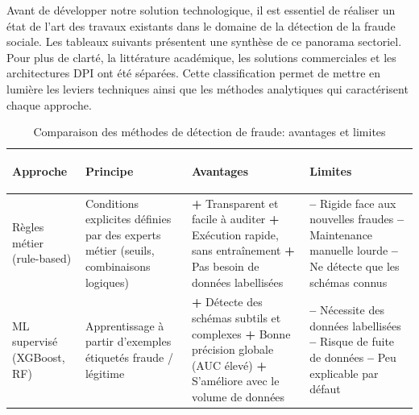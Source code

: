 \documentclass[a4paper, oneside, 12pt]{book}
\newcommand{\thead}[1]{\cellcolor{EYdark}\textcolor{white}{\textbf{#1}}}
\renewcommand{\thead}[1]{\cellcolor{EYyellow}\textcolor{EYdark}{\textbf{#1}}}
\begin{document}
\hspace{0.5cm}Avant de développer notre solution technologique, il est essentiel de réaliser un état de l'art des travaux existants dans le domaine de la détection de la fraude sociale. Les tableaux suivants présentent une synthèse de ce panorama sectoriel. Pour plus de clarté, la littérature académique, les solutions commerciales et les architectures DPI  ont été séparées. Cette classification permet de mettre en lumière les leviers techniques ainsi que les méthodes analytiques qui caractérisent chaque approche.
\begin{table}[H]
\centering
\caption{Comparaison des méthodes de détection de fraude: avantages et limites}
\label{tab:comparaison_approches}
\renewcommand{\arraystretch}{1.3}
\small
\begin{tabular}{|>{\bfseries\raggedright\arraybackslash}p{2.8cm}|p{3.8cm}|p{4.5cm}|p{4.5cm}|}
\hline
\thead{Approche} & \thead{Principe} & \thead{{Avantages}} & \thead{{Limites}} \\
\hline
 
Règles métier (rule-based) 
& Conditions explicites définies par des experts métier (seuils, combinaisons logiques)
& \cellcolor{GreenBG}
  \textcolor{GreenTxt}{\textbf{+}} Transparent et facile à auditer \newline
  \textcolor{GreenTxt}{\textbf{+}} Exécution rapide, sans entraînement \newline
  \textcolor{GreenTxt}{\textbf{+}} Pas besoin de données labellisées
& 
  {\textbf{--}} Rigide face aux nouvelles fraudes \newline
  {\textbf{--}} Maintenance manuelle lourde \newline
  {\textbf{--}} Ne détecte que les schémas connus \\
\hline
 
ML supervisé (XGBoost, RF) 
& Apprentissage à partir d'exemples étiquetés fraude / légitime
& \cellcolor{GreenBG}
  \textcolor{GreenTxt}{\textbf{+}} Détecte des schémas subtils et complexes \newline
  \textcolor{GreenTxt}{\textbf{+}} Bonne précision globale (AUC élevé) \newline
  \textcolor{GreenTxt}{\textbf{+}} S'améliore avec le volume de données
& 
  \textcolor{RedTxt}{\textbf{--}} Nécessite des données labellisées \newline
  \textcolor{RedTxt}{\textbf{--}} Risque de fuite de données \newline
  \textcolor{RedTxt}{\textbf{--}} Peu explicable par défaut \\
\hline
 

\end{tabular}
\end{table}
\end{document}
